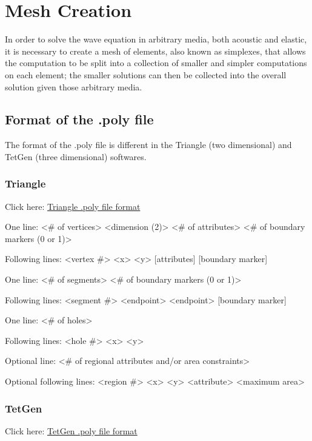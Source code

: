 \newpage
\section{Mesh Creation}

In order to solve the wave equation in arbitrary media, both acoustic and elastic, it is necessary to create a mesh of elements, also known as simplexes, that allows the computation to be split into a collection of smaller and simpler computations on each element; the smaller solutions can then be collected into the overall solution given those arbitrary media. 

\subsection{Format of the .poly file}

The format of the .poly file is different in the Triangle (two dimensional) and TetGen (three dimensional) softwares. 

\subsubsection{Triangle \cite{TrianglePoly}}

Click here: \href{https://www.cs.cmu.edu/~quake/triangle.poly.html}{Triangle .poly file format} 


One line: <\# of vertices> <dimension (2)> <\# of attributes> <\# of boundary markers (0 or 1)>

Following lines: <vertex \#> <x> <y> [attributes] [boundary marker]

One line: <\# of segments> <\# of boundary markers (0 or 1)>

Following lines: <segment \#> <endpoint> <endpoint> [boundary marker]

One line: <\# of holes>

Following lines: <hole \#> <x> <y>

Optional line: <\# of regional attributes and/or area constraints>

Optional following lines: <region \#> <x> <y> <attribute> <maximum area>


\subsubsection{TetGen \cite{TetGenPoly}}

Click here: \href{http://wias-berlin.de/software/tetgen/fformats.poly.html}{TetGen .poly file format}

